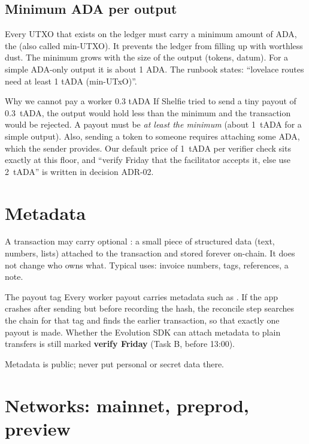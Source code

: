 \subsection{Minimum ADA per output}
Every UTXO that exists on the ledger must carry a minimum amount of ADA, the  (also called min-UTXO). It prevents the ledger from filling up with worthless dust. The minimum grows with the size of the output (tokens, datum). For a simple ADA-only output it is about 1 ADA. The runbook states: ``lovelace routes need at least 1 tADA (min-UTxO)''.

\begin{examplebox}{Why we cannot pay a worker 0.3 tADA}
If Shelfie tried to send a tiny payout of 0.3~tADA, the output would hold less than the minimum and the transaction would be rejected. A payout must be \emph{at least the minimum} (about 1~tADA for a simple output). Also, sending a token to someone requires attaching some ADA, which the sender provides. Our default price of 1~tADA per verifier check sits exactly at this floor, and ``verify Friday that the facilitator accepts it, else use 2~tADA'' is written in decision ADR-02.
\end{examplebox}

\section{Metadata}

A transaction may carry optional : a small piece of structured data (text, numbers, lists) attached to the transaction and stored forever on-chain. It does not change who owns what. Typical uses: invoice numbers, tags, references, a note.

\begin{shelfiebox}{The payout tag}
Every worker payout carries metadata such as . If the app crashes after sending but before recording the hash, the reconcile step searches the chain for that tag and finds the earlier transaction, so that exactly one payout is made. Whether the Evolution SDK can attach metadata to plain transfers is still marked \textbf{verify Friday} (Task B, before 13:00).
\end{shelfiebox}

Metadata is public; never put personal or secret data there.

\section{Networks: mainnet, preprod, preview}

